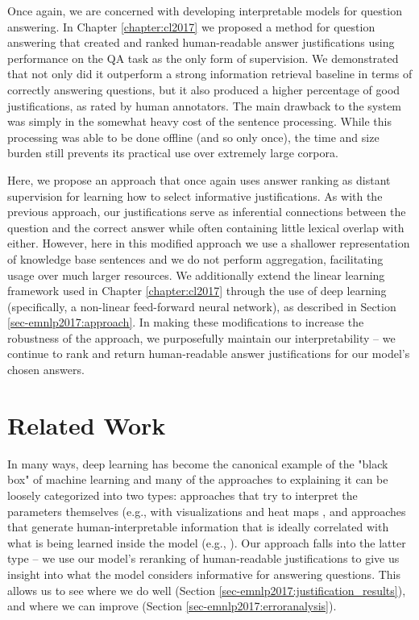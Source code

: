 
Once again, we are concerned with developing interpretable models for question answering.  In Chapter \ref{chapter:cl2017} we proposed a method for question answering that created and ranked human-readable answer justifications using performance on the QA task as the only form of supervision.  We demonstrated that not only did it outperform a strong information retrieval baseline in terms of correctly answering questions, but it also produced a higher percentage of good justifications, as rated by human annotators. The main drawback to the system was simply in the somewhat heavy cost of the sentence processing.  While this processing was able to be done offline (and so only once), the time and size burden still prevents its practical use over extremely large corpora. 

Here, we propose an approach that once again uses answer ranking as distant supervision for learning how to select informative justifications.  As with the previous approach, our justifications serve as inferential connections between the question and the correct answer while often containing little lexical overlap with either.  However, here in this  modified approach we use a  shallower representation of knowledge base sentences and we do not perform aggregation, facilitating usage over much larger resources.  
We additionally extend the linear learning framework used in Chapter \ref{chapter:cl2017} through the use of deep learning (specifically, a non-linear feed-forward neural network), as described in Section \ref{sec-emnlp2017:approach}.  
In making these modifications to increase the robustness of the approach, we purposefully maintain our interpretability -- we continue to rank and return human-readable answer justifications for our model's chosen answers.

\section{Related Work}

In many ways, deep learning has become the canonical example of the "black box" of machine learning and many of the approaches to explaining it can be loosely categorized into two types: approaches that try to interpret the parameters themselves (e.g., with visualizations and heat maps \citep{Zeiler2014VisualizingAU,nips15_hermann, Li2016VisualizingAU}, and approaches that generate human-interpretable information that is ideally correlated with what is being learned inside the model (e.g., \citet{Lei2016RationalizingNP}). Our approach falls into the latter type -- 
we use our model's reranking of human-readable justifications to give us insight into what the model considers informative for answering questions.  This allows us to see where we do well (Section \ref{sec-emnlp2017:justification_results}), and where we can improve (Section  \ref{sec-emnlp2017:erroranalysis}).

